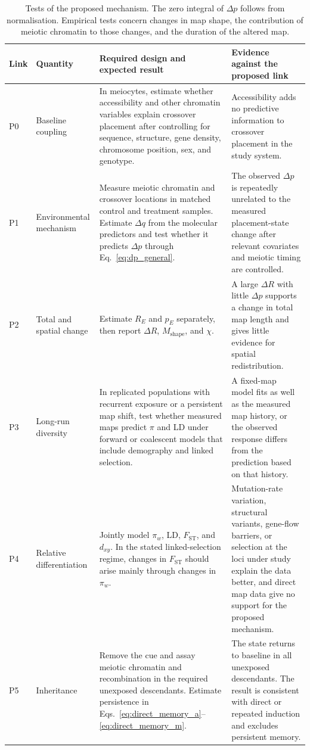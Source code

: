 \documentclass[11pt]{article}
\theoremstyle{remark}
\newcommand{\FST}{F_{\mathrm{ST}}}
\newcommand{\dxy}{d_{xy}}
\begin{document}
\begin{table}[H]
\centering
\small
\begin{tabularx}{\textwidth}{>{\raggedright\arraybackslash}p{}
>{\raggedright\arraybackslash}p{}
>{\raggedright\arraybackslash}X
>{\raggedright\arraybackslash}p{}}
\toprule
Link & Quantity & Required design and expected result & Evidence against the proposed link \\
\midrule
P0 & Baseline coupling & In meiocytes, estimate whether accessibility and other chromatin variables explain crossover placement after controlling for sequence, structure, gene density, chromosome position, sex, and genotype. & Accessibility adds no predictive information to crossover placement in the study system. \\
\addlinespace
P1 & Environmental mechanism & Measure meiotic chromatin and crossover locations in matched control and treatment samples. Estimate $\Delta q$ from the molecular predictors and test whether it predicts $\Delta p$ through Eq.~\eqref{eq:dp_general}. & The observed $\Delta p$ is repeatedly unrelated to the measured placement-state change after relevant covariates and meiotic timing are controlled. \\
\addlinespace
P2 & Total and spatial change & Estimate $R_E$ and $p_E$ separately, then report $\Delta R$, $M_{\mathrm{shape}}$, and $\chi$. & A large $\Delta R$ with little $\Delta p$ supports a change in total map length and gives little evidence for spatial redistribution. \\
\addlinespace
P3 & Long-run diversity & In replicated populations with recurrent exposure or a persistent map shift, test whether measured maps predict $\pi$ and LD under forward or coalescent models that include demography and linked selection. & A fixed-map model fits as well as the measured map history, or the observed response differs from the prediction based on that history. \\
\addlinespace
P4 & Relative differentiation & Jointly model $\pi_w$, LD, $\FST$, and $\dxy$. In the stated linked-selection regime, changes in $\FST$ should arise mainly through changes in $\pi_w$. & Mutation-rate variation, structural variants, gene-flow barriers, or selection at the loci under study explain the data better, and direct map data give no support for the proposed mechanism. \\
\addlinespace
P5 & Inheritance & Remove the cue and assay meiotic chromatin and recombination in the required unexposed descendants. Estimate persistence in Eqs.~\eqref{eq:direct_memory_a}--\eqref{eq:direct_memory_m}. & The state returns to baseline in all unexposed descendants. The result is consistent with direct or repeated induction and excludes persistent memory. \\
\bottomrule
\end{tabularx}
\caption{Tests of the proposed mechanism. The zero integral of $\Delta p$ follows
from normalisation. Empirical tests concern changes in map shape, the contribution
of meiotic chromatin to those changes, and the duration of the altered map.}
\label{tab:predictions}
\end{table}
\end{document}
